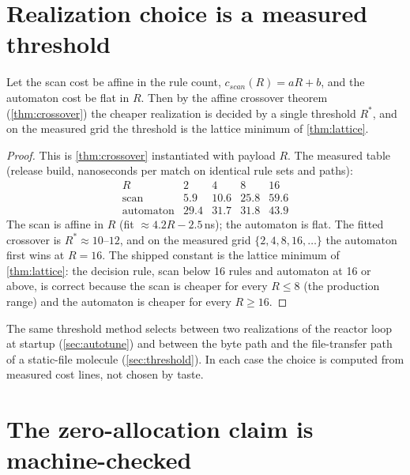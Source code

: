 \section{Realization choice is a measured threshold}\label{sec:route-crossover}

\begin{theorem}\label{thm:66}\label{thm:hybrid}
Let the scan cost be affine in the rule count,
$c_{scan} (R) = aR + b$, and the automaton cost be flat in $R$. Then by
the affine crossover theorem (\autoref{thm:crossover}) the cheaper
realization is decided by a single threshold $R^{\ast}$, and on the
measured grid the threshold is the lattice minimum of
\autoref{thm:lattice}.
\end{theorem}

\begin{proof}
This is \autoref{thm:crossover} instantiated with payload $R$. The
measured table (release build, nanoseconds per match on identical rule
sets and paths):
\[
\begin{array}{l|rrrr}
R & 2 & 4 & 8 & 16\\\hline
\text{scan} & 5.9 & 10.6 & 25.8 & 59.6\\
\text{automaton} & 29.4 & 31.7 & 31.8 & 43.9
\end{array}
\]
The scan is affine in $R$ (fit $\approx 4.2R - 2.5$\,ns); the
automaton is flat. The fitted crossover is $R^{\ast} \approx 10$--$12$,
and on the measured grid $\{2,4,8,16,\ldots\}$ the automaton first
wins at $R = 16$. The shipped constant is the lattice minimum of
\autoref{thm:lattice}: the decision rule, scan below 16 rules and
automaton at 16 or above, is correct because the scan is cheaper for
every $R \leq 8$ (the production range) and the automaton is cheaper
for every $R \geq 16$.
\end{proof}

\begin{remark}
The same threshold method selects between two realizations of the
reactor loop at startup (\autoref{sec:autotune}) and between the byte
path and the file-transfer path of a static-file molecule
(\autoref{sec:threshold}). In each case the choice is computed from
measured cost lines, not chosen by taste.
\end{remark}

\section{The zero-allocation claim is machine-checked}\label{sec:alloc-count}

